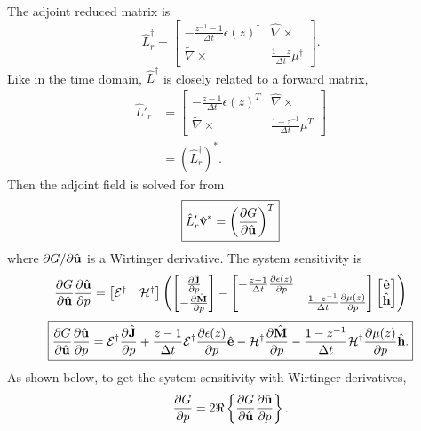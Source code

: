 The adjoint reduced matrix is
%
\begin{equation}
	\hat{L}_r^\dagger =
	\begin{bmatrix}
	-\frac{z^{-1} - 1}{\Delta t} \epsilon(z)^\dagger & \hat{\nabla}\times \\
	\tilde{\nabla}\times & \frac{1 - z}{\Delta t} \mu^\dagger
	\end{bmatrix}.
\end{equation}
%
Like in the time domain, $\hat{L}^\dagger$ is closely related to a forward matrix,
%
\begin{equation}
\begin{aligned}
	\hat{L}'_r &=
	\begin{bmatrix}
	-\frac{z - 1}{\Delta t} \epsilon(z)^T & \hat{\nabla}\times \\
	\tilde{\nabla}\times & \frac{1 - z^{-1}}{\Delta t} \mu^T
	\end{bmatrix} \\
	&= (\hat{L}_r^\dagger)^\ast.
\end{aligned}
\end{equation}
%
Then the adjoint field is solved for from
%
\begin{equation}
\boxed{
	\hat{L}'_r \hat{\ve v}^\ast = \left( \pp{G}{\hat{\ve u}} \right)^T
}%
\end{equation}
%
where $\partial{G}/\partial{\hat{\textbf{u}}}$ is a Wirtinger derivative.  The system sensitivity is
%
\begin{equation}
	\frac{\partial{G}}{\partial{\hat{\textbf{u}}}} \frac{\partial{\hat{\textbf{u}}}}{\partial{p}} =
	\begin{bmatrix}
		\mathcal{E}^\dagger & \mathcal{H}^\dagger
	\end{bmatrix}
	\left(
		\begin{bmatrix}
			\frac{\partial{\hat{\textbf{J}}}}{\partial{p}} \\ -\frac{\partial{\hat{\textbf{M}}}}{\partial{p}}
		\end{bmatrix}
		-	
	    	\begin{bmatrix}
	    	-\frac{z-1}{\Delta t} \frac{\partial{\epsilon(z)}}{\partial{p}} & \\
	    	& \frac{1 - z^{-1}}{\Delta t} \frac{\partial{\mu(z)}}{\partial{p}}
	    	\end{bmatrix}
		\begin{bmatrix}
			\hat{\textbf{e}} \\ \hat{\textbf{h}}
		\end{bmatrix}
	\right)
\end{equation}
%
\begin{equation}
\boxed{
	\pp{G}{\hat{\ve u}} \pp{\hat{\ve u}}{p} =
	\es{E}^\dagger \pp{\hat{\ve J}}{p} + \frac{z-1}{\Delta t} \es{E}^\dagger \pp{\epsilon(z)}{p} \hat{\ve e}
	- \es{H}^\dagger \pp{\hat{\ve M}}{p} - \frac{1 - z^{-1}}{\Delta t} \es{H}^\dagger \pp{\mu(z)}{p} \hat{\ve h}.
}%
\end{equation}
%
As shown below, to get the system sensitivity with Wirtinger derivatives,
%
\begin{equation}
\frac{\partial{G}}{\partial{p}} = 2 \Re \left\{ \frac{\partial{G}}{\partial{\hat{\textbf{u}}}} \frac{\partial{\hat{\textbf{u}}}}{\partial{p}} \right\}.
\end{equation}



